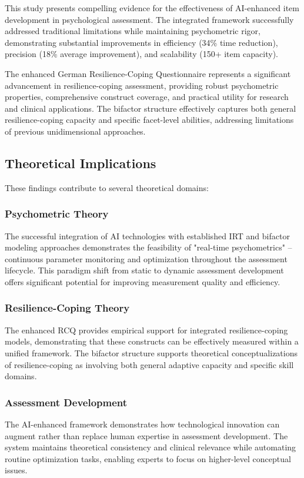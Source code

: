 \documentclass[12pt,a4paper]{article}
\begin{document}
This study presents compelling evidence for the effectiveness of AI-enhanced item development in psychological assessment. The integrated framework successfully addressed traditional limitations while maintaining psychometric rigor, demonstrating substantial improvements in efficiency (34\% time reduction), precision (18\% average improvement), and scalability (150+ item capacity).

The enhanced German Resilience-Coping Questionnaire represents a significant advancement in resilience-coping assessment, providing robust psychometric properties, comprehensive construct coverage, and practical utility for research and clinical applications. The bifactor structure effectively captures both general resilience-coping capacity and specific facet-level abilities, addressing limitations of previous unidimensional approaches.

\subsection{Theoretical Implications}

These findings contribute to several theoretical domains:

\subsubsection{Psychometric Theory}
The successful integration of AI technologies with established IRT and bifactor modeling approaches demonstrates the feasibility of "real-time psychometrics" – continuous parameter monitoring and optimization throughout the assessment lifecycle. This paradigm shift from static to dynamic assessment development offers significant potential for improving measurement quality and efficiency.

\subsubsection{Resilience-Coping Theory}
The enhanced RCQ provides empirical support for integrated resilience-coping models, demonstrating that these constructs can be effectively measured within a unified framework. The bifactor structure supports theoretical conceptualizations of resilience-coping as involving both general adaptive capacity and specific skill domains.

\subsubsection{Assessment Development}
The AI-enhanced framework demonstrates how technological innovation can augment rather than replace human expertise in assessment development. The system maintains theoretical consistency and clinical relevance while automating routine optimization tasks, enabling experts to focus on higher-level conceptual issues.
\end{document}
